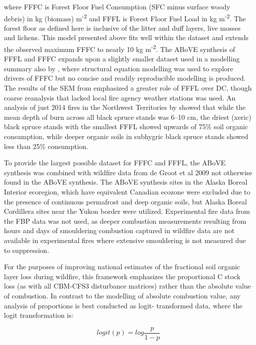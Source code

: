 \documentclass[, manuscript]{copernicus}
\begin{document}
where FFFC is Forest Floor Fuel Consumption (SFC minus surface woody
debris) in kg (biomass) m\textsuperscript{-2} and FFFL is Forest Floor
Fuel Load in kg m\textsuperscript{-2}. The forest floor as defined here
is inclusive of the litter and duff layers, live mosses and lichens.
This model presented above fits well within the dataset and extends the
observed maximum FFFC to nearly 10 kg m\textsuperscript{-2}. The ABoVE
synthesis of FFFL and FFFC \citep{walker2020} expands upon a slightly
smaller dataset used in a modelling summary also by
\citet{walkerFuelAvailabilityNot2020}, where structural equation
modelling was used to explore drivers of FFFC but no concise and readily
reproducible modelling is produced. The results of the SEM from
\citet{walkerFuelAvailabilityNot2020} emphasized a greater role of FFFL
over DC, though coarse reanalysis that lacked local fire agency weather
stations was used. An analysis of just 2014 fires in the Northwest
Territories by \citet{walkerSoilOrganicLayer2018} showed that while the
mean depth of burn across all black spruce stands was 6--10 cm, the
driest (xeric) black spruce stands with the smallest FFFL showed upwards
of 75\% soil organic consumption, while deeper organic soils in
subhygric black spruce stands showed less than 25\% consumption.

To provide the largest possible dataset for FFFC and FFFL, the ABoVE
synthesis was combined with wildfire data from de Groot et al 2009 not
otherwise found in the ABoVE synthesis. The ABoVE synthesis sites in the
Alaska Boreal Interior ecoregion, which have equivalent Canadian ecozone
were excluded due to the presence of continuous permafrost and deep
organic soils, but Alaska Boreal Cordillera sites near the Yukon border
were utilized. Experimental fire data from the FBP data was not used, as
deeper combustion measurements resulting from hours and days of
smouldering combustion captured in wildfire data are not available in
experimental fires where extensive smouldering is not measured due to
suppression.

For the purposes of improving national estimates of the fractional soil
organic layer loss during wildfire, this framework emphasizes the
proportional C stock loss (as with all CBM-CFS3 disturbance matrices)
rather than the absolute value of combustion. In contrast to the
modelling of absolute combustion value, any analysis of proportions is
best conducted as logit- transformed data, where the logit
transformation is:

\begin{equation}
logit(p) = log \frac{p}{1-p}
\end{equation}
\end{document}
